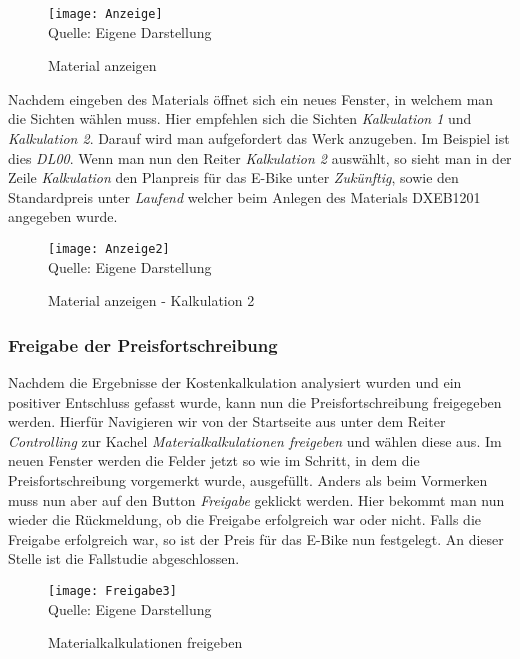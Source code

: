\begin{figure}[H]
    \caption{Material anzeigen}\label{fig:anzeige}
    \texttt{[image: Anzeige]}
    \\
    Quelle: Eigene Darstellung
\end{figure}

Nachdem eingeben des Materials öffnet sich ein neues Fenster, in welchem man die Sichten wählen muss. Hier empfehlen sich die Sichten \textit{Kalkulation 1} und \textit{Kalkulation 2}. Darauf wird man aufgefordert das Werk anzugeben. Im Beispiel ist dies \textit{DL00}.
Wenn man nun den Reiter \textit{Kalkulation 2} auswählt, so sieht man in der Zeile \textit{Kalkulation} den Planpreis für das E-Bike unter \textit{Zukünftig}, sowie den Standardpreis unter \textit{Laufend} welcher beim Anlegen des Materials DXEB1201 angegeben wurde.

\begin{figure}[H]
    \caption{Material anzeigen - Kalkulation 2}\label{fig:anzeige2}
    \texttt{[image: Anzeige2]}
    \\
    Quelle: Eigene Darstellung
\end{figure}

\subsubsection{Freigabe der Preisfortschreibung}
Nachdem die Ergebnisse der Kostenkalkulation analysiert wurden und ein positiver Entschluss gefasst wurde, kann nun die Preisfortschreibung freigegeben werden. Hierfür Navigieren wir von der Startseite aus unter dem Reiter \textit{Controlling} zur Kachel \textit{Materialkalkulationen freigeben} und wählen diese aus.
 Im neuen Fenster werden die Felder jetzt so wie im Schritt, in dem die Preisfortschreibung vorgemerkt wurde, ausgefüllt. Anders als beim Vormerken muss nun aber auf den Button \textit{Freigabe} geklickt werden. Hier bekommt man nun wieder die Rückmeldung, ob die Freigabe erfolgreich war oder nicht. Falls die Freigabe erfolgreich war, so ist der Preis für das E-Bike nun festgelegt.
 An dieser Stelle ist die Fallstudie abgeschlossen.

\begin{figure}[H]
    \caption{Materialkalkulationen freigeben}\label{fig:freigabe3}
    \texttt{[image: Freigabe3]}
    \\
    Quelle: Eigene Darstellung
\end{figure}